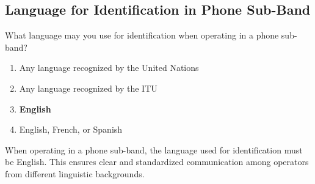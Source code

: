 \subsection{Language for Identification in Phone Sub-Band}
\label{T1F04}

\begin{tcolorbox}[colback=gray!10!white,colframe=black!75!black,title=T1F04]
What language may you use for identification when operating in a phone sub-band?
\begin{enumerate}[label=\Alph*),noitemsep]
    \item Any language recognized by the United Nations
    \item Any language recognized by the ITU
    \item \textbf{English}
    \item English, French, or Spanish
\end{enumerate}
\end{tcolorbox}

When operating in a phone sub-band, the language used for identification must be English. This ensures clear and standardized communication among operators from different linguistic backgrounds.